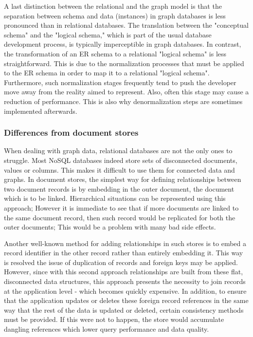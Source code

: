 A last distinction between the relational and the graph model is that the separation between schema and data (instances) in graph databases is less pronounced than in relational databases.
The translation between the "conceptual schema" and the "logical schema," which is part of the usual database development process, is typically imperceptible in graph databases.
In contrast, the transformation of an ER schema to a relational "logical schema" is less straightforward.
This is due to the normalization processes that must be applied to the ER schema in order to map it to a relational "logical schema".
Furthermore, such normalization stages frequently tend to push the developer move away from the reality aimed to represent.
Also, often this stage may cause a reduction of performance.
This is also why denormalization steps are sometimes implemented afterwards.

\subsubsection{Differences from document stores} \label{subsubsection:LiteratureReview/ReviewofGraphDatabaseSystems/Graphdatabasecharacteristics/Differencesfromdocumentstores}
When dealing with graph data, relational databases are not the only ones to struggle.
Most NoSQL databases indeed store sets of disconnected documents, values or columns.
This makes it difficult to use them for connected data and graphs.
In document stores, the simplest way for defining relationships between two document records is by embedding in the outer document, the document which is to be linked.
Hierarchical situations can be represented using this approach;
However it is immediate to see that if more documents are linked to the same document record, then such record would be replicated for both the outer documents;
This would be a problem with many bad side effects.

Another well-known method for adding relationships in such stores is to embed a record identifier in the other record rather than entirely embedding it.
This way is resolved the issue of duplication of records and foreign keys may be applied.
However, since with this second approach relationships are built from these flat, disconnected data structures, this approach presents the necessity to join records at the application level - which becomes quickly expensive.
In addition, to ensure that the application updates or deletes these foreign record references in the same way that the rest of the data is updated or deleted, certain consistency methods must be provided.
If this were not to happen, the store would accumulate dangling references which lower query performance and data quality.

